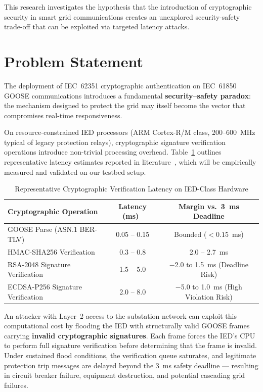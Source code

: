 \documentclass[12pt,a4paper]{article}
\begin{document}
This research investigates the hypothesis that the introduction of cryptographic security in smart grid communications creates an unexplored security-safety trade-off that can be exploited via targeted latency attacks.

\section{Problem Statement}

The deployment of IEC~62351 cryptographic authentication on IEC~61850 GOOSE communications introduces a fundamental \textbf{security--safety paradox}: the mechanism designed to protect the grid may itself become the vector that compromises real-time responsiveness.

On resource-constrained IED processors (ARM Cortex-R/M class, 200--600~MHz typical of legacy protection relays), cryptographic signature verification operations introduce non-trivial processing overhead. Table~\ref{tab:crypto_latency} outlines representative latency estimates reported in literature~\cite{strobel2016}, which will be empirically measured and validated on our testbed setup.

\begin{table}[H]
\centering
\caption{Representative Cryptographic Verification Latency on IED-Class Hardware}
\label{tab:crypto_latency}
\vspace{0.2cm}
\begin{tabularx}{\textwidth}{X c c}
\toprule
\textbf{Cryptographic Operation} & \textbf{Latency (ms)}~\cite{strobel2016} & \textbf{Margin vs.\ 3~ms Deadline} \\
\midrule
GOOSE Parse (ASN.1 BER-TLV) & 0.05 -- 0.15 & Bounded ($< 0.15$~ms) \\
HMAC-SHA256 Verification & 0.3 -- 0.8 & 2.0 -- 2.7~ms \\
RSA-2048 Signature Verification & 1.5 -- 5.0 & $-$2.0 to 1.5~ms (Deadline Risk) \\
ECDSA-P256 Signature Verification & 2.0 -- 8.0 & $-$5.0 to 1.0~ms (High Violation Risk) \\
\bottomrule
\end{tabularx}
\end{table}

An attacker with Layer~2 access to the substation network can exploit this computational cost by flooding the IED with structurally valid GOOSE frames carrying \textbf{invalid cryptographic signatures}. Each frame forces the IED's CPU to perform full signature verification before determining that the frame is invalid. Under sustained flood conditions, the verification queue saturates, and legitimate protection trip messages are delayed beyond the 3~ms safety deadline --- resulting in circuit breaker failure, equipment destruction, and potential cascading grid failures.
\end{document}
